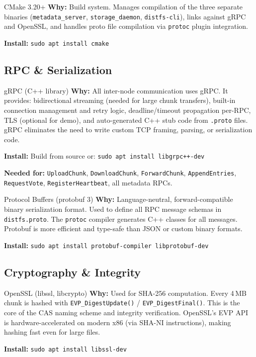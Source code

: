 \documentclass[12pt,a4paper]{article}
\begin{document}
\begin{toolbox}{CMake 3.20+}
\textbf{Why:} Build system. Manages compilation of the three separate binaries (\texttt{metadata\_server}, \texttt{storage\_daemon}, \texttt{distfs-cli}), links against gRPC and OpenSSL, and handles proto file compilation via \texttt{protoc} plugin integration.

\textbf{Install:} \texttt{sudo apt install cmake}
\end{toolbox}

\subsection{RPC \& Serialization}

\begin{toolbox}{gRPC (C++ library)}
\textbf{Why:} All inter-node communication uses gRPC. It provides: bidirectional streaming (needed for large chunk transfers), built-in connection management and retry logic, deadline/timeout propagation per-RPC, TLS (optional for demo), and auto-generated C++ stub code from \texttt{.proto} files. gRPC eliminates the need to write custom TCP framing, parsing, or serialization code.

\textbf{Install:} Build from source or: \texttt{sudo apt install libgrpc++-dev}

\textbf{Needed for:} \texttt{UploadChunk}, \texttt{DownloadChunk}, \texttt{ForwardChunk}, \texttt{AppendEntries}, \texttt{RequestVote}, \texttt{RegisterHeartbeat}, all metadata RPCs.
\end{toolbox}

\begin{toolbox}{Protocol Buffers (protobuf 3)}
\textbf{Why:} Language-neutral, forward-compatible binary serialization format. Used to define all RPC message schemas in \texttt{distfs.proto}. The \texttt{protoc} compiler generates C++ classes for all messages. Protobuf is more efficient and type-safe than JSON or custom binary formats.

\textbf{Install:} \texttt{sudo apt install protobuf-compiler libprotobuf-dev}
\end{toolbox}

\subsection{Cryptography \& Integrity}

\begin{toolbox}{OpenSSL (libssl, libcrypto)}
\textbf{Why:} Used for SHA-256 computation. Every 4\,MB chunk is hashed with \texttt{EVP\_DigestUpdate()} / \texttt{EVP\_DigestFinal()}. This is the core of the CAS naming scheme and integrity verification. OpenSSL's EVP API is hardware-accelerated on modern x86 (via SHA-NI instructions), making hashing fast even for large files.

\textbf{Install:} \texttt{sudo apt install libssl-dev}
\end{toolbox}
\end{document}
